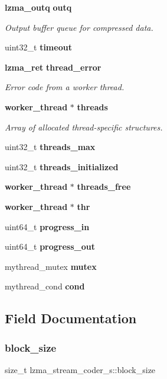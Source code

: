 \begin{DoxyCompactItemize}
\textbf{ lzma\+\_\+outq} \textbf{ outq}
\begin{DoxyCompactList}\small\item\em Output buffer queue for compressed data. \end{DoxyCompactList}\item 
uint32\+\_\+t \textbf{ timeout}
\item 
\textbf{ lzma\+\_\+ret} \textbf{ thread\+\_\+error}
\begin{DoxyCompactList}\small\item\em Error code from a worker thread. \end{DoxyCompactList}\item 
\textbf{ worker\+\_\+thread} $\ast$ \textbf{ threads}
\begin{DoxyCompactList}\small\item\em Array of allocated thread-\/specific structures. \end{DoxyCompactList}\item 
uint32\+\_\+t \textbf{ threads\+\_\+max}
\item 
uint32\+\_\+t \textbf{ threads\+\_\+initialized}
\item 
\textbf{ worker\+\_\+thread} $\ast$ \textbf{ threads\+\_\+free}
\item 
\textbf{ worker\+\_\+thread} $\ast$ \textbf{ thr}
\item 
uint64\+\_\+t \textbf{ progress\+\_\+in}
\item 
uint64\+\_\+t \textbf{ progress\+\_\+out}
\item 
\mbox{\label{structlzma__stream__coder__s_a12041b888b47e2afea0b289a32ec616e}} 
mythread\+\_\+mutex {\bfseries mutex}
\item 
\mbox{\label{structlzma__stream__coder__s_a6c8e775cf46e5f8d93b4b3338f8652e1}} 
mythread\+\_\+cond {\bfseries cond}
\end{DoxyCompactItemize}


\subsection{Field Documentation}
\mbox{\label{structlzma__stream__coder__s_ade09c58010b68e2f7f8b47dc729f1a60}} 
\subsubsection{block\+\_\+size}
{\footnotesize\ttfamily size\+\_\+t lzma\+\_\+stream\+\_\+coder\+\_\+s\+::block\+\_\+size}

